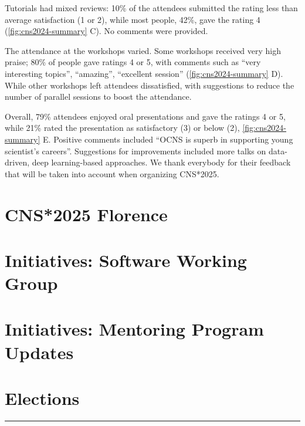 \documentclass[11pt,a4paper,oneside]{article}
\begin{document}
Tutorials had mixed reviews: 10\% of the attendees submitted the rating less than average satisfaction (1 or 2), while most people, 42\%, gave the rating 4 (\cref{fig:cns2024-summary} C). No comments were provided.

The attendance at the workshops varied.
Some workshops received very high praise; 80\% of people gave ratings 4 or 5, with comments such as \enquote{very interesting topics}, \enquote{amazing}, \enquote{excellent session} (\cref{fig:cns2024-summary} D).
While other workshops left attendees dissatisfied, with suggestions to reduce the number of parallel sessions to boost the attendance.

Overall, 79\% attendees enjoyed oral presentations and gave the ratings 4 or 5, while 21\% rated the presentation as satisfactory (3) or below (2), \cref{fig:cns2024-summary} E.
Positive comments included \enquote{OCNS is superb in supporting young scientist's careers}.
Suggestions for improvements included more talks on data-driven, deep learning-based approaches.
We thank everybody for their feedback that will be taken into account when organizing CNS*2025.


\newpage

\section*{CNS*2025 Florence}%
\lipsum[1-3]

\newpage
\section*{Initiatives: Software Working Group}%
\lipsum[1-3]

\newpage
\section*{Initiatives: Mentoring Program Updates}%
\lipsum[1-3]

\newpage
\section*{Elections}%
\rule{\textwidth}{0.4pt}
\lipsum[1-3]

\newpage

\newpage

\newpage
\end{document}
